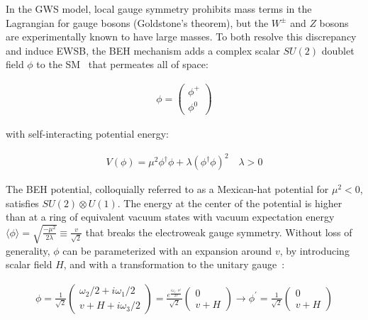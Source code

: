 In the GWS model, local gauge symmetry prohibits mass terms in the Lagrangian for gauge bosons (Goldstone's theorem), but the $W^\pm$ and $Z$ bosons are experimentally known to have large masses.
To both resolve this discrepancy and induce EWSB, the BEH mechanism adds a complex scalar $SU(2)$ doublet field $\phi$ to the SM~\cite{nagashima_2013_V2} that permeates all of space:
\begin{linenomath*}
\begin{align}
\phi=\left(\begin{array}{l}
\phi^{+} \\
\phi^0
\end{array}\right)
\end{align}
\end{linenomath*}
with self-interacting potential energy:
\begin{linenomath*}
\begin{align}
V(\phi) = \mu^2 \phi^{\dagger} \phi + \lambda\left(\phi^{\dagger} \phi\right)^2 \quad \lambda >0
\end{align}
\end{linenomath*}
The BEH potential, colloquially referred to as a Mexican-hat potential for $\mu^2 < 0$, satisfies $SU(2) \otimes U(1)$.
The energy at the center of the potential is higher than at a ring of equivalent vacuum states with vacuum expectation energy $\langle\phi\rangle=\sqrt{\frac{-\mu^2}{2 \lambda}} \equiv \frac{v}{\sqrt{2}}$ that breaks the electroweak gauge symmetry.
Without loss of generality, $\phi$ can be parameterized with an expansion around $v$, by introducing scalar field $H$, and with a transformation to the unitary gauge~\cite{nagashima_2013_V2}:
\begin{linenomath*}
\begin{align}
\phi
=\frac{1}{\sqrt{2}}
\left(\begin{array}{l}
\omega_2/2 + i \omega_1/2 \\
v + H + i \omega_3/2
\end{array}\right)
= \frac{e^{\frac{ i \omega_j \cdot \sigma^j}{2v}}}{\sqrt{2}}
\left(\begin{array}{c}
0 \\
v+H
\end{array}\right)
\longrightarrow \phi^{\prime} = \frac{1}{\sqrt{2}}
\left(\begin{array}{c}
0 \\
v+H
\end{array}\right)
\end{align}
\end{linenomath*}
